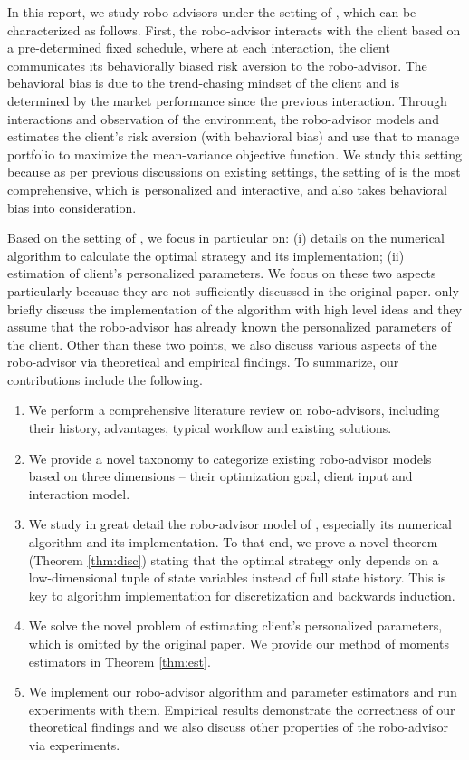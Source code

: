 In this report, we study robo-advisors under the setting of , which can be characterized as follows. First, the robo-advisor interacts with the client based on a pre-determined fixed schedule, where at each interaction, the client communicates its behaviorally biased risk aversion to the robo-advisor. The behavioral bias is due to the trend-chasing mindset of the client and is determined by the market performance since the previous interaction. Through interactions and observation of the environment, the robo-advisor models and estimates the client's risk aversion (with behavioral bias) and use that to manage portfolio to maximize the mean-variance objective function. We study this setting because as per previous discussions on existing settings, the setting of  is the most comprehensive, which is personalized and interactive, and also takes behavioral bias into consideration.

Based on the setting of , we focus in particular on: (i) details on the numerical algorithm to calculate the optimal strategy and its implementation; (ii) estimation of client's personalized parameters. We focus on these two aspects particularly because they are not sufficiently discussed in the original paper.  only briefly discuss the implementation of the algorithm with high level ideas and they assume that the robo-advisor has already known the personalized parameters of the client. Other than these two points, we also discuss various aspects of the robo-advisor via theoretical and empirical findings. To summarize, our contributions include the following.\begin{enumerate}
    \item We perform a comprehensive literature review on robo-advisors, including their history, advantages, typical workflow and existing solutions.
    \item We provide a novel taxonomy to categorize existing robo-advisor models based on three dimensions -- their optimization goal, client input and interaction model.
    \item We study in great detail the robo-advisor model of , especially its numerical algorithm and its implementation. To that end, we prove a novel theorem (Theorem \ref{thm:disc}) stating that the optimal strategy only depends on a low-dimensional tuple of state variables instead of full state history. This is key to algorithm implementation for discretization and backwards induction.
    \item We solve the novel problem of estimating client's personalized parameters, which is omitted by the original paper. We provide our method of moments estimators in Theorem \ref{thm:est}.
    \item We implement our robo-advisor algorithm and parameter estimators and run experiments with them. Empirical results demonstrate the correctness of our theoretical findings and we also discuss other properties of the robo-advisor via experiments.
\end{enumerate}

